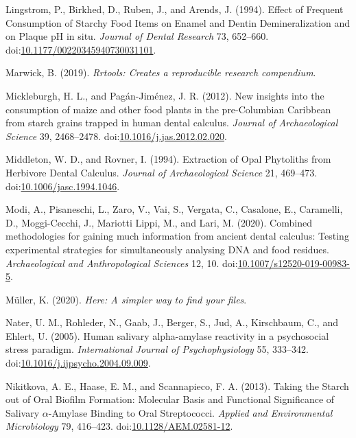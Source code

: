 \documentclass[utf8]{frontiers/frontiersSCNS}
\newlength{\cslhangindent}
\newlength{\cslentryspacingunit} %
\newenvironment{CSLReferences}[2] %
 {%
  \setlength{\parindent}{0pt}
  \ifodd #1
  \let\oldpar\par
  \def\par{\hangindent=\cslhangindent\oldpar}
  \fi
  \setlength{\parskip}{#2\cslentryspacingunit}
 }%
 {}
\begin{document}
\begin{CSLReferences}{1}{0}
\leavevmode{}%
Lingstrom, P., Birkhed, D., Ruben, J., and Arends, J. (1994). Effect of {Frequent Consumption} of {Starchy Food Items} on {Enamel} and {Dentin Demineralization} and on {Plaque pH} in situ. \emph{Journal of Dental Research} 73, 652--660. doi:\href{https://doi.org/10.1177/00220345940730031101}{10.1177/00220345940730031101}.

\leavevmode{}%
Marwick, B. (2019). \emph{Rrtools: {Creates} a reproducible research compendium}.

\leavevmode{}%
Mickleburgh, H. L., and Pagán-Jiménez, J. R. (2012). New insights into the consumption of maize and other food plants in the pre-{Columbian Caribbean} from starch grains trapped in human dental calculus. \emph{Journal of Archaeological Science} 39, 2468--2478. doi:\href{https://doi.org/10.1016/j.jas.2012.02.020}{10.1016/j.jas.2012.02.020}.

\leavevmode{}%
Middleton, W. D., and Rovner, I. (1994). Extraction of {Opal Phytoliths} from {Herbivore Dental Calculus}. \emph{Journal of Archaeological Science} 21, 469--473. doi:\href{https://doi.org/10.1006/jasc.1994.1046}{10.1006/jasc.1994.1046}.

\leavevmode{}%
Modi, A., Pisaneschi, L., Zaro, V., Vai, S., Vergata, C., Casalone, E., Caramelli, D., Moggi-Cecchi, J., Mariotti Lippi, M., and Lari, M. (2020). Combined methodologies for gaining much information from ancient dental calculus: Testing experimental strategies for simultaneously analysing {DNA} and food residues. \emph{Archaeological and Anthropological Sciences} 12, 10. doi:\href{https://doi.org/10.1007/s12520-019-00983-5}{10.1007/s12520-019-00983-5}.

\leavevmode{}%
Müller, K. (2020). \emph{Here: {A} simpler way to find your files}.

\leavevmode{}%
Nater, U. M., Rohleder, N., Gaab, J., Berger, S., Jud, A., Kirschbaum, C., and Ehlert, U. (2005). Human salivary alpha-amylase reactivity in a psychosocial stress paradigm. \emph{International Journal of Psychophysiology} 55, 333--342. doi:\href{https://doi.org/10.1016/j.ijpsycho.2004.09.009}{10.1016/j.ijpsycho.2004.09.009}.

\leavevmode{}%
Nikitkova, A. E., Haase, E. M., and Scannapieco, F. A. (2013). Taking the {Starch} out of {Oral Biofilm Formation}: {Molecular Basis} and {Functional Significance} of {Salivary} {\(\alpha\)}-{Amylase Binding} to {Oral Streptococci}. \emph{Applied and Environmental Microbiology} 79, 416--423. doi:\href{https://doi.org/10.1128/AEM.02581-12}{10.1128/AEM.02581-12}.


\end{CSLReferences}
\end{document}
